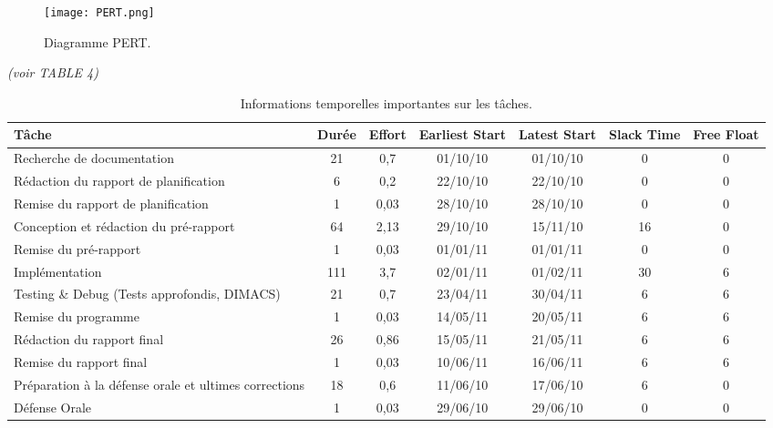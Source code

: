 \documentclass[runningheads]{llncs}
\begin{document}
\begin{figure}[!htb]
\begin{center}
  \texttt{[image: PERT.png]}
  \caption{Diagramme PERT.}\label{fig:PERT}
\end{center}
\end{figure}

\begin{center}\textit{(voir TABLE 4)}\end{center}

\begin{table}[htbp]
\begin{center}
\begin{tabular}{|p{2cm}||c|c|c|c|c|c|}
\hline
\textbf{T\^ache} & Dur\'ee & Effort & Earliest Start & Latest Start & Slack Time & Free Float\\
\hline\hline
Recherche de documentation & 21 & 0,7 & 01/10/10 & 01/10/10 & 0 & 0 \\
\hline
Rédaction du rapport de planification & 6 & 0,2 & 22/10/10 & 22/10/10 & 0 & 0 \\
\hline
Remise du rapport de planification & 1 & 0,03 & 28/10/10 & 28/10/10 & 0 & 0 \\
\hline
Conception et rédaction du pré-rapport  & 64 & 2,13 & 29/10/10 & 15/11/10 & 16 & 0 \\
\hline
Remise du pré-rapport & 1 & 0,03 & 01/01/11 & 01/01/11 & 0 & 0 \\
\hline
Implémentation & 111 & 3,7 & 02/01/11 & 01/02/11 & 30 & 6 \\
\hline
Testing \& Debug (Tests approfondis, DIMACS) & 21 & 0,7 & 23/04/11 & 30/04/11 & 6 & 6 \\
\hline
Remise du programme & 1 & 0,03 & 14/05/11 & 20/05/11 & 6 & 6 \\
\hline
Rédaction du rapport final & 26 & 0,86 & 15/05/11 & 21/05/11 & 6 & 6 \\
\hline
Remise du rapport final & 1 & 0,03 & 10/06/11 & 16/06/11 & 6 & 6 \\
\hline
Préparation à la défense orale et ultimes corrections & 18 & 0,6 & 11/06/10 & 17/06/10 & 6 & 0 \\
\hline
Défense Orale & 1 & 0,03 & 29/06/10 & 29/06/10 & 0 & 0 \\
\hline
\end{tabular}
\end{center}
   \caption{Informations temporelles importantes sur les t\^aches.}
   \label{tab:PERT}
\end{table}
\end{document}
